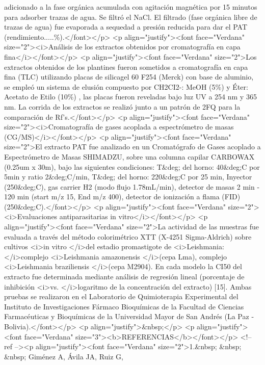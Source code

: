 adicionado a la fase orgánica acumulada con agitación magnética por 15 minutos
para adsorber trazas de agua. Se filtró el NaCl. El filtrado (fase orgánica
libre de trazas de agua) fue evaporada a sequedad a presión reducida para dar el
PAT (rendimiento.....\%).</font></p> <p align="justify"><font face="Verdana"
size="2"><i>Análisis de los extractos obtenidos por cromatografía en capa
fina</i></font></p> <p align="justify"><font face="Verdana" size="2">Los
extractos obtenidos de los plantines fueron sometidos a cromatografía en capa
fina (TLC) utilizando placas de silicagel 60 F254 (Merck) con base de aluminio,
se empleó un sistema de elusión compuesto por CH2CI2-: MeOH (5\%) y Éter:
Acetato de Etilo (10\%) , las placas fueron reveladas bajo luz UV a 254 nm y 365
nm. La corrida de los extractos se realizó junto a un patrón de 2FQ para la
comparación de Rf's.</font></p> <p align="justify"><font face="Verdana"
size="2"><i>Cromatografía de gases acoplada a espectrómetro de masas
(CG/MS)</i></font></p> <p align="justify"><font face="Verdana" size="2">El
extracto PAT fue analizado en un Cromatógrafo de Gases acoplado a Espectrómetro
de Masas SHIMADZU, sobre una columna capilar CARBOWAX (0.25um x 30m), bajo las
siguientes condiciones: T\&deg; del horno: 40\&deg;C por 5min y ratio
2\&deg;C/min, T\&deg; del horno: 220\&deg;C por 25 min, Inyector (250\&deg;C),
gas carrier H2 (modo flujo 1.78mL/min), detector de masas 2 min - 120 min (start
m/z 15, End m/z 400), detector de ionización a flama (FID)
(250\&deg;C).</font></p> <p align="justify"><font face="Verdana"
size="2"><i>Evaluaciones antiparasitarias in vitro</i></font></p> <p
align="justify"><font face="Verdana" size="2">La actividad de las muestras fue
evaluada a través del método colorimétrico XTT (X-4251 Sigma-Aldrich) sobre
cultivos <i>in vitro </i>del estadio promastigote de <i>Leishmania: </i>complejo
<i>Leishmania amazonensis </i>(cepa Lma), complejo <i>Leishmania braziliensis
</i>(cepa M2904). En cada modelo la CI50 del extracto fue determinada mediante
análisis de regresión lineal (porcentaje de inhibición <i>vs. </i>logaritmo de
la concentración del extracto) [15]. Ambas pruebas se realizaron en el
Laboratorio de Quimioterapia Experimental del Instituto de Investigaciones
Fármaco Bioquímicas de la Facultad de Ciencias Farmacéuticas y Bioquímicas de la
Universidad Mayor de San Andrés (La Paz - Bolivia).</font></p> <p
align="justify">\&nbsp;</p> <p align="justify"><font face="Verdana"
size="3"><b>REFERENCIAS</b></font></p> <!-- ref --><p align="justify"><font
face="Verdana" size="2">1.\&nbsp; \&nbsp; \&nbsp; Giménez A, Ávila JA, Ruiz G,
